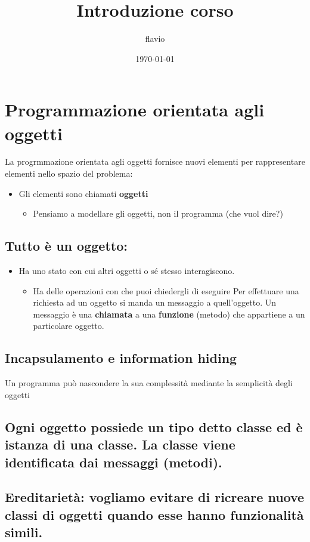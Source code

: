 \documentclass[11pt]{article}
\author{flavio}
\date{\today}
\title{Introduzione corso}
\begin{document}
\maketitle
\tableofcontents

\section{Programmazione orientata agli oggetti}
\label{sec:org7a8805e}
La progrmmazione orientata agli oggetti fornisce nuovi elementi per rappresentare elementi nello spazio del problema:
\begin{itemize}
\item Gli elementi sono chiamati \textbf{oggetti}
\begin{itemize}
\item Pensiamo a modellare gli oggetti, non il programma (che vuol dire?)
\end{itemize}
\end{itemize}
\subsection{Tutto è un oggetto:}
\label{sec:org7a456f2}
\begin{itemize}
\item Ha uno stato con cui altri oggetti o sé stesso interagiscono.
\begin{itemize}
\item Ha delle operazioni con che puoi chiedergli di eseguire
Per effettuare una richiesta ad un oggetto si manda un messaggio a quell'oggetto. Un messaggio è una \textbf{chiamata} a una \textbf{funzione} (metodo) che appartiene a un particolare oggetto.
\end{itemize}
\end{itemize}
\subsection{Incapsulamento e information hiding}
\label{sec:orgb80341d}
Un programma può nascondere la sua complessità mediante la semplicità degli oggetti
\subsection{Ogni oggetto possiede un tipo detto \textbf{classe} ed è istanza di una classe. La classe viene identificata dai messaggi (metodi).}
\label{sec:org00b96e2}
\subsection{Ereditarietà: vogliamo evitare di ricreare nuove classi di oggetti quando esse hanno funzionalità simili.}
\label{sec:orga168ba2}
\end{document}
